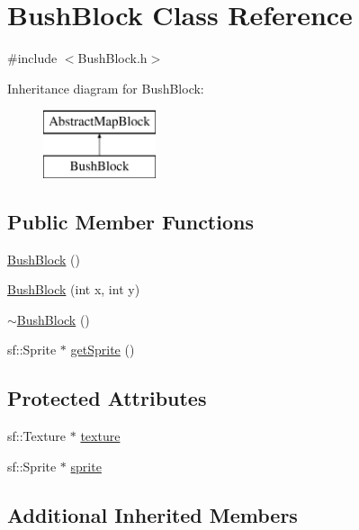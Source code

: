 \hypertarget{class_bush_block}{}\section{Bush\+Block Class Reference}
\label{class_bush_block}


{\ttfamily \#include $<$Bush\+Block.\+h$>$}

Inheritance diagram for Bush\+Block\+:\begin{figure}[H]
\begin{center}
\leavevmode
\includegraphics[height=2.000000cm]{class_bush_block}
\end{center}
\end{figure}
\subsection*{Public Member Functions}
\begin{DoxyCompactItemize}
\item 
\hyperlink{class_bush_block_a866cb791101f70cd89795b0de45c041b}{Bush\+Block} ()
\item 
\hyperlink{class_bush_block_a27d102ac30e12c537e6a8de34ce50779}{Bush\+Block} (int x, int y)
\item 
\hyperlink{class_bush_block_acffc1c20ebfc301e3c9b99912b20c5e2}{$\sim$\+Bush\+Block} ()
\item 
sf\+::\+Sprite $\ast$ \hyperlink{class_bush_block_ac6346ab038665e207134bb68ab3f20a1}{get\+Sprite} ()
\end{DoxyCompactItemize}
\subsection*{Protected Attributes}
\begin{DoxyCompactItemize}
\item 
sf\+::\+Texture $\ast$ \hyperlink{class_bush_block_af04c47ff2490b42258b0b56a6dc1aabe}{texture}
\item 
sf\+::\+Sprite $\ast$ \hyperlink{class_bush_block_a24bfc3a63232d1466d9c5ddb7459cf55}{sprite}
\end{DoxyCompactItemize}
\subsection*{Additional Inherited Members}


